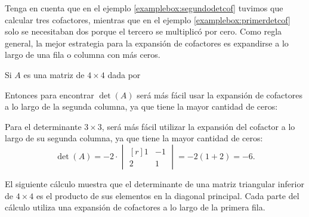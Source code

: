 Tenga en cuenta que en el ejemplo \ref{examplebox:segundodetcof} tuvimos que calcular tres cofactores, mientras que en el ejemplo \ref{examplebox:primerdetcof} solo se necesitaban dos porque el tercero se multiplicó por cero. Como regla general, la mejor estrategia para la expansión de cofactores es expandirse a lo largo de una fila o columna con más ceros.

\begin{examplebox}{}{}
    Si $A$ es una matriz de $4 \times 4$ dada por
    \begin{matrizn}
    \end{matrizn}
    Entonces para encontrar $\det(A)$ será más fácil usar la expansión de cofactores a lo largo de la segunda columna, ya que tiene la mayor cantidad de ceros:
    \begin{matrizn}
    \end{matrizn}
    Para el determinante $3 \times 3$, será más fácil utilizar la expansión del cofactor a lo largo de su segunda columna, ya que tiene la mayor cantidad de ceros:
    $$\det(A) = -2 \cdot \begin{vmatrix*}[r]
        1 & -1 \\
        2 & 1
    \end{vmatrix*} = -2(1 + 2) = -6.$$
\end{examplebox}

\begin{examplebox}{}{}
    El siguiente cálculo muestra que el determinante de una matriz triangular inferior de $4 \times 4$ es el producto de sus elementos en la diagonal principal. Cada parte del cálculo utiliza una expansión de cofactores a lo largo de la primera fila.
    \begin{matrizn}
    \end{matrizn}
\end{examplebox}

